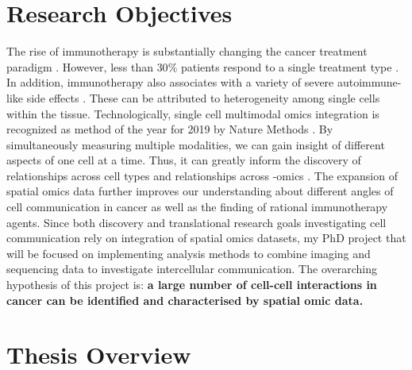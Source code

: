 \label{subsec:ST_seq}





\section{Research Objectives}
The rise of immunotherapy is substantially changing the cancer treatment paradigm \cite{dobosz2019intriguing}. However, less than $30\%$ patients respond to a single treatment type \cite{ott2017combination}. In addition, immunotherapy also associates with a variety of severe autoimmune-like side effects \cite{naidoo2015toxicities,bertrand2015immune}. These can be attributed to heterogeneity among single cells within the tissue. Technologically, single cell multimodal omics integration is recognized as method of the year for 2019 by Nature Methods \cite{teichmann2020method}. By simultaneously measuring multiple modalities, we can gain insight of different aspects of one cell at a time. Thus, it can greatly inform the discovery of relationships across cell types and relationships across -omics \cite{teichmann2020method}. The expansion of spatial omics data further improves our understanding about different angles of cell communication in cancer as well as the finding of rational immunotherapy agents. Since both discovery and translational research goals investigating cell communication rely on integration of spatial omics datasets, my PhD project that will be focused on implementing analysis methods to combine imaging and sequencing data to investigate intercellular communication.   
The overarching hypothesis of this project is: \textbf{a large number of cell-cell interactions in cancer can be identified and characterised by spatial omic data.}



\section{Thesis Overview}

